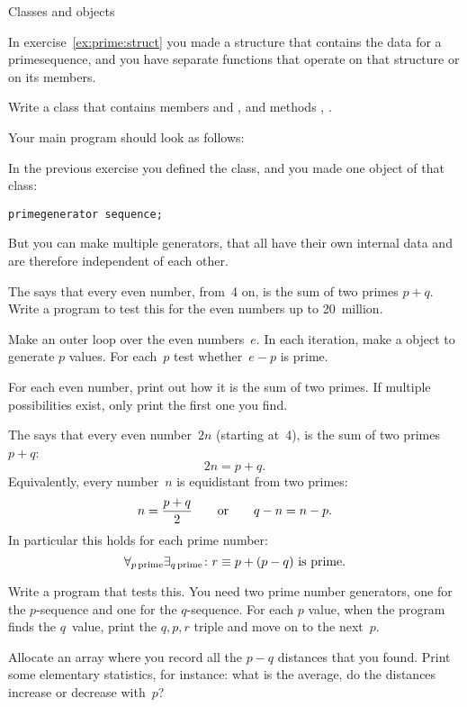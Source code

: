  {Classes and objects}

\prerequisite{\ref{sec:object}}

In exercise~\ref{ex:prime:struct} you made a structure that contains
the data for a primesequence, and you have separate functions that
operate on that structure or on its members.

\begin{exercise}
  \label{ex:prime:sequence}
  Write a class  that contains members
   and
  , and methods , .

  Your main program should look as follows:
\end{exercise}

In the previous exercise you defined the  class, and
you made one object of that class:
\begin{verbatim}
primegenerator sequence;
\end{verbatim}
But you can make multiple generators, that all have their own internal
data and are therefore independent of each other.

\begin{exercise}
  \label{ex:goldbach:conj}
  The  says that every even number,
  from~4 on, is the sum of two primes $p+q$. Write a program to test this
  for the even numbers up to 20~million.

  Make an outer loop over the even numbers~$e$. In each iteration,
  make a  object to generate $p$ values.
  For each~$p$ test whether~$e-p$ is prime.

  For each even number, print out how it is the sum of two primes. If
  multiple possibilities exist, only print the first one you find.
\end{exercise}

\begin{exercise}
  \label{ex:prime:goldbach-pqr}
  The  says that every even number~$2n$
  (starting at~4), is the sum of two primes $p+q$: \[ 2n=p+q.\]
  Equivalently, every number~$n$ is equidistant from two primes:
  \[ n=\frac{p+q}2\qquad\hbox{or}\qquad q-n = n-p.\]
  In particular this holds for each prime number:
  \[ \forall_{p\,\mathrm{prime}}\exists_{q\,\mathrm{prime}}\colon
  \hbox{$r\equiv p+(p-q)$ is prime}. \]

  Write a program that tests this. You need two prime number
  generators, one for the $p$-sequence and one for the $q$-sequence.
  For each $p$ value, 
  when the program finds the $q$~value, print the $q,p,r$ triple and
  move on to the next~$p$.

  Allocate an array where you record all the $p-q$ distances that you
  found. Print some elementary statistics, for instance: what is the average, do the
  distances increase or decrease with~$p$?
\end{exercise}

